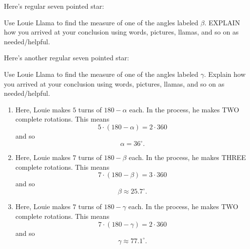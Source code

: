 \documentclass[nooutcomes,noauthor,hints,handout]{ximera}
\begin{document}
\mynewpage


\begin{question}
Here's regular seven pointed star:
    \begin{center}
    \end{center}
    Use Louie Llama to find the measure of one of the angles labeled
    $\beta$. EXPLAIN how you arrived at your conclusion using words,
    pictures, llamas, and so on as needed/helpful.  
\end{question}

\mynewpage


\begin{question}
 Here's another regular seven pointed star:
    \begin{center}
    \end{center}
    Use Louie Llama to find the measure of one of the angles labeled
    $\gamma$. Explain how you arrived at your conclusion using words,
    pictures, llamas, and so on as needed/helpful.
  \begin{freeResponse}
    \begin{enumerate}
    \item Here, Louie makes $5$ turns of $180-\alpha$ each. In
      the process, he makes TWO complete rotations. This means
      \[
      5\cdot (180-\alpha) = 2\cdot 360
      \]
      and so
      \[
      \alpha= 36^\circ.
      \]
    \item Here, Louie makes $7$ turns of $180-\beta$ each. In
      the process, he makes THREE complete rotations. This means
      \[
      7\cdot (180-\beta) = 3\cdot 360
      \]
      and so
      \[
      \beta\approx 25.7^\circ.
      \]
    \item Here, Louie makes $7$ turns of $180-\gamma$ each. In
      the process, he makes TWO complete rotations. This means
      \[
      7\cdot (180-\gamma) = 2\cdot 360
      \]
      and so
      \[
      \gamma\approx 77.1^\circ.
      \]
    \end{enumerate}
  \end{freeResponse}
\end{question}
\end{document}
